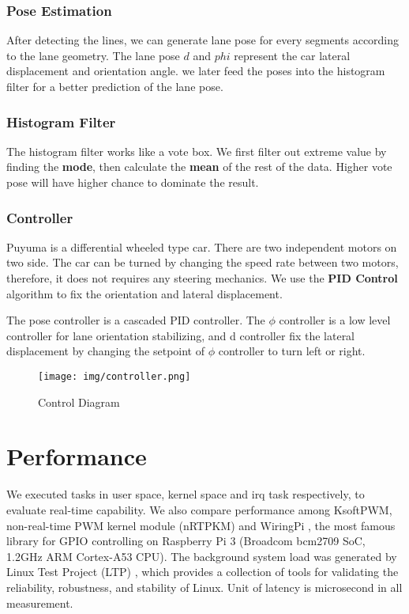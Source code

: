 \documentclass[conference]{IEEEtran}
\begin{document}
\subsubsection{Pose Estimation}

After detecting the lines, we can generate lane pose for every segments according to the lane geometry. The lane pose $d$ and $phi$ represent the car lateral displacement and orientation angle. we later feed the poses into the histogram filter for a better prediction of the lane pose.

\subsubsection{Histogram Filter}

The histogram filter works like a vote box. We first filter out extreme value by finding the \textbf{mode}, then calculate the \textbf{mean} of the rest of the data. Higher vote pose will have higher chance to dominate the result.

\subsubsection{Controller}

Puyuma is a differential wheeled type car. There are two independent motors on two side. The car can be turned by changing the speed rate between two motors, therefore, it does not requires any steering mechanics. We use the \textbf{PID Control} algorithm to fix the orientation and lateral displacement.

The pose controller is a cascaded PID controller. The $\phi$ controller is a low level controller for lane orientation stabilizing, and d controller fix the lateral displacement by changing the setpoint of $\phi$ controller to turn left or right.

\begin{figure}	
	\centering
	\texttt{[image: img/controller.png]}
	\caption{Control Diagram}
	\label{fig:controller}
\end{figure}

\section{Performance}

We executed tasks in user space, kernel space and irq task respectively, to evaluate real-time capability. We also compare performance among KsoftPWM, non-real-time PWM kernel module (nRTPKM) and WiringPi \cite{WiringPi}, the most famous library for GPIO controlling on Raspberry Pi 3 (Broadcom bcm2709 SoC, 1.2GHz ARM Cortex-A53 CPU). The background system load was generated by Linux Test Project (LTP) \cite{LTP}, which provides a collection of tools for validating the reliability, robustness, and stability of Linux. Unit of latency is microsecond in all measurement.
\end{document}
